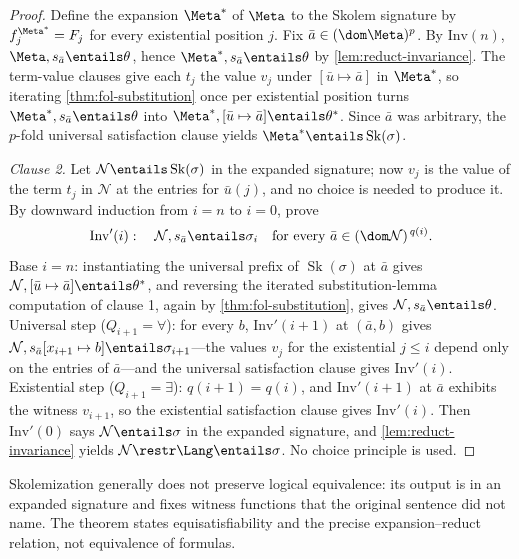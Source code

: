 \begin{proof}
Define the expansion \(\Meta^{*}\) of \(\Meta\) to the Skolem signature
by \(f_j^{\Meta^{*}}=F_j\) for every existential position \(j\).  Fix
\(\bar a\in(\dom\Meta)^{p}\).  By \(\mathrm{Inv}(n)\),
\(\Meta,s_{\bar a}\entails\theta\), hence
\(\Meta^{*},s_{\bar a}\entails\theta\) by \cref{lem:reduct-invariance}.
The term-value clauses give each \(t_j\) the value \(v_j\) under
\([\bar u\mapsto\bar a]\) in \(\Meta^{*}\), so iterating
\cref{thm:fol-substitution} once per existential position turns
\(\Meta^{*},s_{\bar a}\entails\theta\) into
\(\Meta^{*},[\bar u\mapsto\bar a]\entails\theta^{*}\).  Since \(\bar a\)
was arbitrary, the \(p\)-fold universal satisfaction clause yields
\(\Meta^{*}\entails\operatorname{Sk}(\sigma)\).

\emph{Clause 2.}  Let \(\mathcal N\entails\operatorname{Sk}(\sigma)\) in
the expanded signature; now \(v_j\) is the value of the term \(t_j\) in
\(\mathcal N\) at the entries for \(\bar u(j)\), and no choice is needed
to produce it.  By downward induction from \(i=n\) to \(i=0\), prove
\[
 \mathrm{Inv}'(i):\quad
 \mathcal N,s_{\bar a}\entails\sigma_i
 \quad\text{for every }\bar a\in(\dom\mathcal N)^{\,q(i)}.
\]
Base \(i=n\): instantiating the universal prefix of
\(\operatorname{Sk}(\sigma)\) at \(\bar a\) gives
\(\mathcal N,[\bar u\mapsto\bar a]\entails\theta^{*}\), and reversing the
iterated substitution-lemma computation of clause 1, again by
\cref{thm:fol-substitution}, gives
\(\mathcal N,s_{\bar a}\entails\theta\).  Universal step
(\(Q_{i+1}=\forall\)): for every \(b\), \(\mathrm{Inv}'(i+1)\) at
\((\bar a,b)\) gives
\(\mathcal N,s_{\bar a}[x_{i+1}\mapsto b]\entails\sigma_{i+1}\)---the
values \(v_j\) for the existential \(j\le i\) depend only on the entries
of \(\bar a\)---and the universal satisfaction clause gives
\(\mathrm{Inv}'(i)\).  Existential step (\(Q_{i+1}=\exists\)):
\(q(i+1)=q(i)\), and \(\mathrm{Inv}'(i+1)\) at \(\bar a\) exhibits the
witness \(v_{i+1}\), so the existential satisfaction clause gives
\(\mathrm{Inv}'(i)\).  Then \(\mathrm{Inv}'(0)\) says
\(\mathcal N\entails\sigma\) in the expanded signature, and
\cref{lem:reduct-invariance} yields
\(\mathcal N\restr\Lang\entails\sigma\).  No choice principle is used.
\end{proof}

Skolemization generally does not preserve logical equivalence: its output is
in an expanded signature and fixes witness functions that the original
sentence did not name.  The theorem states equisatisfiability and the precise
expansion--reduct relation, not equivalence of formulas.

